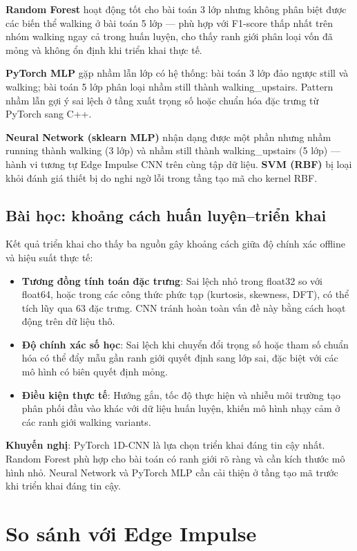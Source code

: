 \textbf{Random Forest} hoạt động tốt cho bài toán 3 lớp nhưng không phân biệt được các biến thể walking ở bài toán 5 lớp --- phù hợp với F1-score thấp nhất trên nhóm walking ngay cả trong huấn luyện, cho thấy ranh giới phân loại vốn đã mỏng và không ổn định khi triển khai thực tế.

\textbf{PyTorch MLP} gặp nhầm lẫn lớp có hệ thống: bài toán 3 lớp đảo ngược still và walking; bài toán 5 lớp phân loại nhầm still thành walking\_upstairs. Pattern nhầm lẫn gợi ý sai lệch ở tầng xuất trọng số hoặc chuẩn hóa đặc trưng từ PyTorch sang C++.

\textbf{Neural Network (sklearn MLP)} nhận dạng được một phần nhưng nhầm running thành walking (3 lớp) và nhầm still thành walking\_upstairs (5 lớp) --- hành vi tương tự Edge Impulse CNN trên cùng tập dữ liệu. \textbf{SVM (RBF)} bị loại khỏi đánh giá thiết bị do nghi ngờ lỗi trong tầng tạo mã cho kernel RBF.

\subsection{Bài học: khoảng cách huấn luyện--triển khai}
\label{sec:deployment_gap}

Kết quả triển khai cho thấy ba nguồn gây khoảng cách giữa độ chính xác offline và hiệu suất thực tế:
\begin{itemize}
    \item \textbf{Tương đồng tính toán đặc trưng}: Sai lệch nhỏ trong float32 so với float64, hoặc trong các công thức phức tạp (kurtosis, skewness, DFT), có thể tích lũy qua 63 đặc trưng. CNN tránh hoàn toàn vấn đề này bằng cách hoạt động trên dữ liệu thô.
    \item \textbf{Độ chính xác số học}: Sai lệch khi chuyển đổi trọng số hoặc tham số chuẩn hóa có thể đẩy mẫu gần ranh giới quyết định sang lớp sai, đặc biệt với các mô hình có biên quyết định mỏng.
    \item \textbf{Điều kiện thực tế}: Hướng gắn, tốc độ thực hiện và nhiễu môi trường tạo phân phối đầu vào khác với dữ liệu huấn luyện, khiến mô hình nhạy cảm ở các ranh giới walking variants.
\end{itemize}

\textbf{Khuyến nghị}: PyTorch 1D-CNN là lựa chọn triển khai đáng tin cậy nhất. Random Forest phù hợp cho bài toán có ranh giới rõ ràng và cần kích thước mô hình nhỏ. Neural Network và PyTorch MLP cần cải thiện ở tầng tạo mã trước khi triển khai đáng tin cậy.

\section{So sánh với Edge Impulse}
\label{sec:edge_impulse_comparison}

